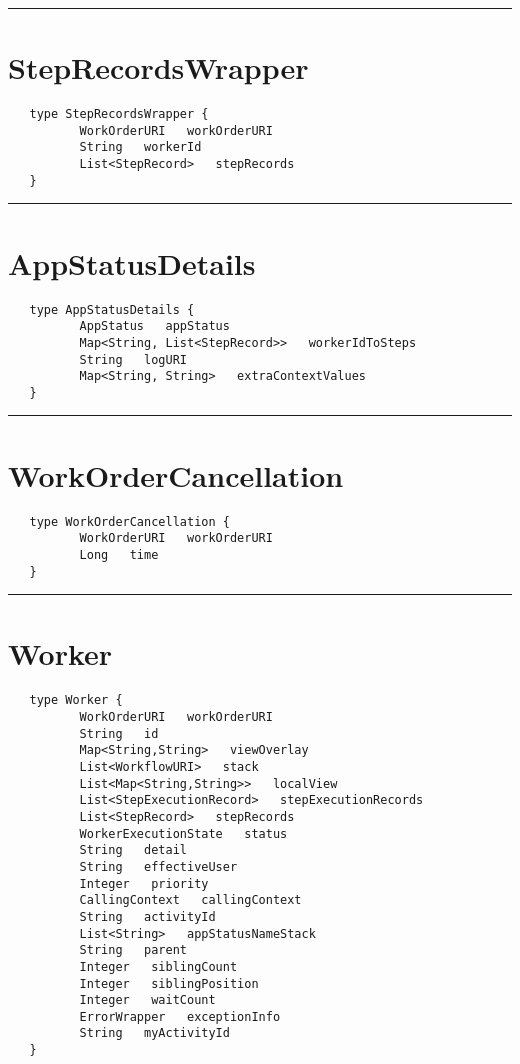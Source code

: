 \rule{12cm}{2pt}
\section{StepRecordsWrapper}
\label{type:StepRecordsWrapper}

\begin{verbatim}
   type StepRecordsWrapper {
          WorkOrderURI   workOrderURI
          String   workerId
          List<StepRecord>   stepRecords
   }
\end{verbatim}

\rule{12cm}{2pt}
\section{AppStatusDetails}
\label{type:AppStatusDetails}

\begin{verbatim}
   type AppStatusDetails {
          AppStatus   appStatus
          Map<String, List<StepRecord>>   workerIdToSteps
          String   logURI
          Map<String, String>   extraContextValues
   }
\end{verbatim}

\rule{12cm}{2pt}
\section{WorkOrderCancellation}
\label{type:WorkOrderCancellation}

\begin{verbatim}
   type WorkOrderCancellation {
          WorkOrderURI   workOrderURI
          Long   time
   }
\end{verbatim}

\rule{12cm}{2pt}
\section{Worker}
\label{type:Worker}

\begin{verbatim}
   type Worker {
          WorkOrderURI   workOrderURI
          String   id
          Map<String,String>   viewOverlay
          List<WorkflowURI>   stack
          List<Map<String,String>>   localView
          List<StepExecutionRecord>   stepExecutionRecords
          List<StepRecord>   stepRecords
          WorkerExecutionState   status
          String   detail
          String   effectiveUser
          Integer   priority
          CallingContext   callingContext
          String   activityId
          List<String>   appStatusNameStack
          String   parent
          Integer   siblingCount
          Integer   siblingPosition
          Integer   waitCount
          ErrorWrapper   exceptionInfo
          String   myActivityId
   }
\end{verbatim}

